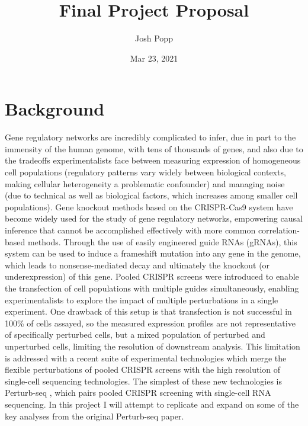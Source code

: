 \documentclass[letterpaper, 11pt]{article}
\title{Final Project Proposal}
\author{Josh Popp}
\date{Mar 23, 2021}
\begin{document}
\maketitle

\setlength{\parindent}{0em}
\setlength{\parskip}{0.8em}
\vspace{1em}

\section*{Background}
Gene regulatory networks are incredibly complicated to infer, due in part to the immensity of the human genome, with tens of thousands of genes, and also due to the tradeoffs experimentalists face between measuring expression of homogeneous cell populations (regulatory patterns vary widely between biological contexts, making cellular heterogeneity a problematic confounder) and managing noise (due to technical as well as biological factors, which increases among smaller cell populations). Gene knockout methods based on the CRISPR-Cas9 system have become widely used for the study of gene regulatory networks, empowering causal inference that cannot be accomplished effectively with more common correlation-based methods. Through the use of easily engineered guide RNAs (gRNAs), this system can be used to induce a frameshift mutation into any gene in the genome, which leads to nonsense-mediated decay and ultimately the knockout (or underexpression) of this gene. Pooled CRISPR screens were introduced to enable the transfection of cell populations with multiple guides simultaneously, enabling experimentalists to explore the impact of multiple perturbations in a single experiment. One drawback of this setup is that transfection is not successful in 100\% of cells assayed, so the measured expression profiles are not representative of specifically perturbed cells, but a mixed population of perturbed and unperturbed cells, limiting the resolution of downstream analysis. This limitation is addressed with a recent suite of experimental technologies which merge the flexible perturbations of pooled CRISPR screens with the high resolution of single-cell sequencing technologies. The simplest of these new technologies is Perturb-seq \cite{perturbseq}, which pairs pooled CRISPR screening with single-cell RNA sequencing. In this project I will attempt to replicate and expand on some of the key analyses from the original Perturb-seq paper.
\end{document}
